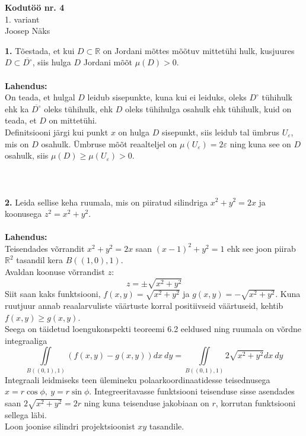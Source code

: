 \documentclass{article}
\begin{document}
\begin{center}
\Large\textbf{Kodutöö nr. 4}\\
1. variant\\
\small{Joosep Näks}
\end{center}
\textbf{1. }Tõestada, et kui $D\subset \mathbb{R}$ on Jordani mõttes mõõtuv mittetühi hulk, kusjuures $D\subset \overline{D^\circ}$, siis hulga $D$ Jordani mõõt $\mu(D)>0$.\\\\
\textbf{Lahendus:}\\
On teada, et hulgal $D$ leidub sisepunkte, kuna kui ei leiduks, oleks $D^\circ$ tühihulk ehk ka $\overline{D^\circ}$ oleks tühihulk, ehk $D$ oleks tühihulga osahulk ehk tühihulk, kuid on teada, et $D$ on mittetühi.\\
Definitsiooni järgi kui punkt $x$ on hulga $D$ sisepunkt, siis leidub tal ümbrus $U_\varepsilon$, mis on $D$ osahulk. Ümbruse mõõt reaalteljel on $\mu(U_\varepsilon)=2\varepsilon$ ning kuna see on $D$ osahulk, siis $\mu(D)\geq\mu(U_\varepsilon)>0$.\\\\\\\\
\textbf{2.} Leida sellise keha ruumala, mis on piiratud silindriga $x^2+y^2=2x$ ja koonusega $z^2=x^2+y^2$.\\\\
\textbf{Lahendus:}\\
Teisendades võrrandit $x^2+y^2=2x$ saan $(x-1)^2+y^2=1$ ehk see joon piirab $\mathbb{R}^2$ tasandil kera $B((1,0),1)$.\\
Avaldan koonuse võrrandist $z$:$$z=\pm\sqrt{x^2+y^2}$$Siit saan kaks funktsiooni, $f(x,y)=\sqrt{x^2+y^2}$ ja $g(x,y)=-\sqrt{x^2+y^2}$. Kuna ruutjuur annab reaalarvuliste väärtuste korral positiivseid väärtuseid, kehtib $f(x,y)\geq g(x,y)$.\\
Seega on täidetud loengukonspekti teoreemi 6.2 eeldused ning ruumala on võrdne integraaliga $$\iint\limits_{B((0,1),1)}(f(x,y)-g(x,y))dx\ dy=\iint\limits_{B((0,1),1)}2\sqrt{x^2+y^2}dx\ dy$$Integraali leidmiseks teen ülemineku polaarkoordinaatidesse teisednusega $x=r\cos\phi,\ y=r\sin\phi$. Integreeritavasse funktsiooni teisenduse sisse asendades saan $2\sqrt{x^2+y^2}=2r$ ning kuna teisenduse jakobiaan on $r$, korrutan funktsiooni sellega läbi.\\
 Loon joonise silindri projektsioonist $xy$ tasandile.
\begin{center}
\end{center}
\end{document}
